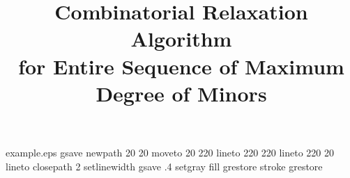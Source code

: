 %
%
%
%
%
\begin{filecontents*}{example.eps}
gsave
newpath
  20 20 moveto
  20 220 lineto
  220 220 lineto
  220 20 lineto
closepath
2 setlinewidth
gsave
  .4 setgray fill
grestore
stroke
grestore
\end{filecontents*}
%
\RequirePackage{fix-cm}
%
\documentclass[smallextended,final]{svjour3}       %
%
\smartqed  %
%
\usepackage[dvipdfmx]{graphicx}
\usepackage{amsmath}
\usepackage{amsfonts}
\usepackage{comment}
\usepackage{color}
\newcommand{\postpone}{\textcolor{red}{[MEMO]:あとでかく}}
%
%
%
%
\newcommand{\rank}{\mathrm{rank} \ }
\newcommand{\trank}{\mathrm{term}\mbox{-}\mathrm{rank} \ }
%


\title{ %
Combinatorial Relaxation Algorithm \\ for Entire Sequence of Maximum Degree of Minors
}

